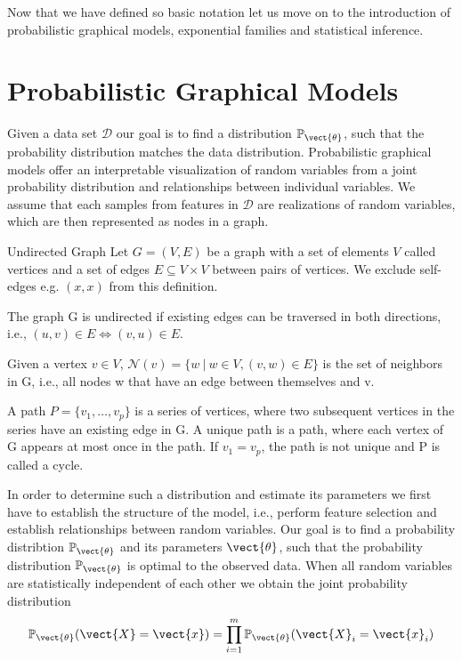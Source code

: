     Now that we have defined so basic notation let us move on to the introduction of probabilistic graphical models, exponential families and statistical inference.


\section{Probabilistic Graphical Models}
\label{sec:pgm}
Given a data set $\mathcal{D}$ our goal is to find a distribution $\mathbb{P}_{\vect{\theta}}$, such that the probability distribution matches the data distribution.
Probabilistic graphical models offer an interpretable visualization of random variables from a joint probability distribution and relationships between individual variables.
We assume that each samples from features in $\mathcal{D}$ are  realizations of random variables, which are then represented as nodes in a graph.
    \begin{definition}{Undirected Graph}
        Let $G=(V,E)$ be a graph with a set of elements $V$ called vertices and a set of edges $E \subseteq V \times V$ between pairs of vertices. 
        We exclude self-edges e.g. $(x,x)$ from this definition.

        The graph G is undirected if existing edges can be traversed in both directions, i.e., $(u,v) \in E \Leftrightarrow (v,u) \in E$.

        Given a vertex $v \in V$, $\mathcal{N}(v) = \{w \:\lvert\: w \in V, (v,w) \in E\}$ is the set of neighbors in G, i.e., all nodes w that have an edge between themselves and v.

        A path $P = \{v_1, \ldots, v_p\}$ is a series of vertices, where two subsequent vertices in the series have an existing edge in G. 
        A unique path is a path, where each vertex of G appears at most once in the path.
        If $v_1 = v_p$, the path is not unique and P is called a cycle.
    \end{definition}
In order to determine such a distribution and estimate its parameters we first have to establish the structure of the model, i.e., perform feature selection and establish relationships between random variables.
Our goal is to find a probability distribtion $\mathbb{P}_{\vect{\theta}}$ and its parameters $\vect{\theta}$, such that the probability distribution $\mathbb{P}_{\vect{\theta}}$ is optimal \wrt to the observed data.
When all random variables are statistically independent of each other  we obtain the joint probability distribution
\begin{equation}
    \mathbb{P}_{\vect{\theta}}(\vect{X} = \vect{x}) = \prod_{i=1}^m \mathbb{P}_{\vect{\theta}}(\vect{X}_i = \vect{x}_i)
\end{equation}

